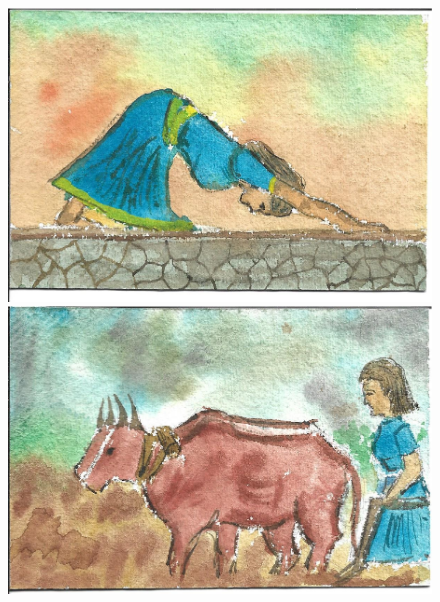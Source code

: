 \documentclass[12pt]{article}
\begin{document}
\begin{figure}[h!]
\includegraphics[width=.331\paperwidth]{pictures/LE}
\hspace*{1cm}\includegraphics[width=.331\paperwidth]{pictures/LP}
\end{figure}

\newpage
\end{document}
